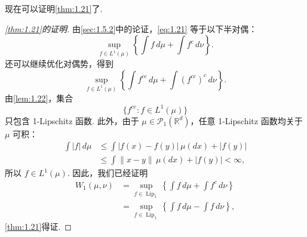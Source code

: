 现在可以证明\autoref{thm:1.21}了.

\begin{proof}[\autoref{thm:1.21}的证明]
由\autoref{sec:1.5.2}中的论证，\eqref{eq:1.21} 等于以下半对偶：
$$
\sup_{f\in L^1(\mu)}\left\{\int f\,d\mu+\int f^c\,d\nu\right\}.
$$
还可以继续优化对偶势，得到
$$
\sup_{f\in L^1(\mu)}
\left\{\int f^{cc}\,d\mu+\int(f^{cc})^c\,d\nu\right\}.
$$
由\autoref{lem:1.22}，集合
$$
\{f^{cc}:f\in L^1(\mu)\}
$$
只包含 1-Lipschitz 函数. 此外，由于 $\mu\in\mathcal{P}_1(\mathbb{R}^d)$，任意 1-Lipschitz 函数均关于 $\mu$ 可积：
$$
\begin{aligned}
\int|f|\,d\mu
&\leq\int|f(x)-f(y)|\,\mu(dx)+|f(y)|\\
&\leq\int\|x-y\|\,\mu(dx)+|f(y)|<\infty,
\end{aligned}
$$
所以 $f\in L^1(\mu)$. 因此，我们已经证明
\begin{equation}\label{eq:1.23}
\begin{aligned}
W_1(\mu,\nu)
&=\sup_{f\in\operatorname{Lip}_1}
\left\{\int f\,d\mu+\int f^c\,d\nu\right\}\\
&=\sup_{f\in\operatorname{Lip}_1}
\left\{\int f\,d\mu-\int f\,d\nu\right\},
\end{aligned}
\end{equation}
\autoref{thm:1.21}得证.
\end{proof}
